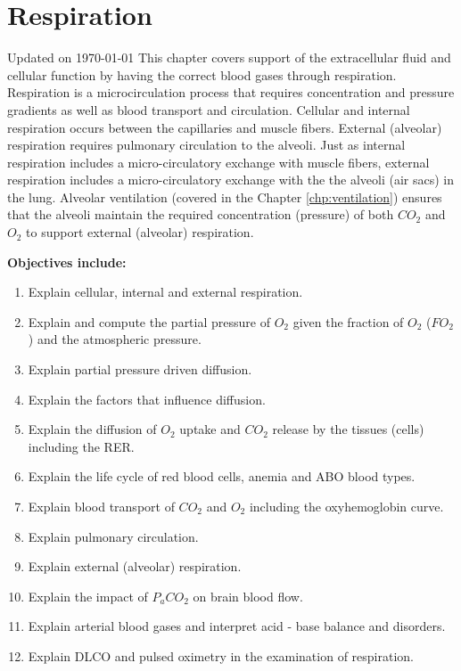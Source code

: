 \chapter{Respiration}\label{chp:respiration}
Updated on \today
\minitoc
This chapter covers support of the extracellular fluid and cellular function by having the correct blood gases through respiration. Respiration is a microcirculation process that requires concentration and pressure gradients as well as blood transport and circulation. Cellular and internal respiration occurs between the capillaries and muscle fibers. External (alveolar) respiration requires pulmonary circulation to the alveoli. Just as internal respiration includes a micro-circulatory exchange with muscle fibers, external respiration includes a micro-circulatory exchange with the the alveoli (air sacs) in the lung. Alveolar ventilation (covered in the Chapter \ref{chp:ventilation}) ensures that the alveoli maintain the required concentration (pressure) of both $CO_2$ and $O_2$ to support external (alveolar) respiration.

\vspace{5mm}
\begin{svgraybox}
\textbf{Objectives include:}
\begin{enumerate}
    \item Explain cellular, internal and external respiration.
    \item Explain and compute the partial pressure of $O_2$ given the fraction of $O_2$ ($FO_2$) and the atmospheric pressure.
    \item Explain partial pressure driven diffusion.
    \item Explain the factors that influence diffusion.
    \item Explain the diffusion of $O_2$ uptake and $CO_2$ release by the tissues (cells) including the RER.
    \item Explain the life cycle of red blood cells, anemia and ABO blood types.
    \item Explain blood transport of $CO_2$ and $O_2$ including the oxyhemoglobin curve.
    \item Explain pulmonary circulation.
    \item Explain external (alveolar) respiration.
    \item Explain the impact of $P_aCO_2$ on brain blood flow.
    \item Explain arterial blood gases and interpret acid - base balance and disorders.
    \item Explain DLCO and pulsed oximetry in the examination of respiration.
\end{enumerate}
\end{svgraybox}


